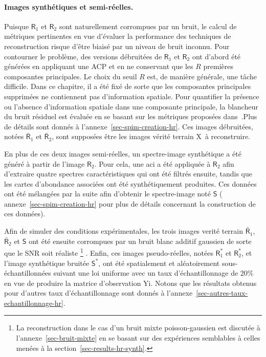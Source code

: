 \paragraph{Images synthétiques et semi-réelles.} Puisque $\mathsf{R}_1$ et $\mathsf{R}_2$ sont naturellement corrompues par un bruit, le calcul de métriques pertinentes en vue d'évaluer la performance des techniques de reconstruction risque d'être biaisé par un niveau de bruit inconnu. Pour contourner le problème, des versions débruitées de $\mathsf{R}_1$ et $\mathsf{R}_2$ ont d'abord été générées en appliquant une ACP et en ne conservant que les $R$ premières composantes principales. Le choix du seuil $R$ est, de manière générale, une tâche difficile. Dans ce chapitre, il a été fixé de sorte que les composantes principales supprimées ne contiennent pas d'information spatiale. Pour quantifier la présence ou l’absence d’information spatiale dans une composante principale, la blancheur du bruit résiduel est évaluée en se basant sur les métriques proposées dans~\cite[chap. 3]{riot2018residual}.Plus de détails sont donnés à l'annexe~\ref{sec-spim-creation-hr}. Ces images débruitées, notées $\bar{\mathsf{R}}_1$ et $\bar{\mathsf{R}}_2$, sont supposées être les images vérité terrain \gls{X} à reconstruire.

En plus de ces deux images semi-réelles, un spectre-image synthétique a été généré à partir de l'image $\mathsf{R}_2$. Pour cela, une \gls{aci} a été appliquée à $\mathsf{R}_2$ afin d'extraire quatre spectres caractéristiques qui ont été filtrés ensuite, tandis que les cartes d'abondance associées ont été synthétiquement produites. Ces données ont été mélangées par la suite  afin d'obtenir le spectre-image noté $\mathsf{S}$ (\cf{} annexe~\ref{sec-spim-creation-hr} pour plus de détails concernant la construction de ces données).

Afin de simuler des conditions expérimentales, les trois images verité terrain $\bar{\mathsf{R}}_1$, $\bar{\mathsf{R}}_2$ et $\mathsf{S}$ ont été ensuite corrompues par un bruit blanc additif gaussien de sorte que le SNR soit réaliste%
%
\footnote{La reconstruction dans le cas d'un bruit mixte poisson-gaussien est discutée à l'annexe~\ref{sec-bruit-mixte} en se basant sur des expériences semblables à celles menées à la section~\ref{sec-results-hr-synth}.}%
%
. Enfin, ces images pseudo-réelles, notées $\mathsf{R}_1^*$ et $\mathsf{R}_2^*$, et l'image synthétique bruitée $\mathsf{S}^*$, ont été spatialement et aléatoirement sous-échantillonnées suivant une loi uniforme avec un taux d'échantillonnage de 20\% en vue de produire la matrice d'observation \gls{Yi}. Notons que les résultats obtenus pour d'autres taux d'échantillonnage sont donnés à l'annexe~\ref{sec-autres-taux-echantillonnage-hr}. 

